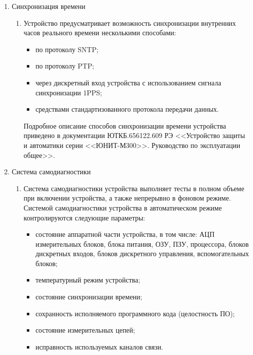 \begin{enumerate}
\begin{enumerate}
\end{enumerate}

\item Синхронизация времени
\begin{enumerate}

\item
Устройство предусматривает возможность синхронизации внутренних часов реального времени несколькими способами:
\begin{itemize}
\item по протоколу SNTP;
\item по протоколу PTP;
\item через дискретный вход устройства с использованием сигнала синхронизации 1PPS;
\item {средствами стандартизованного протокола передачи данных.}
\end{itemize}
Подробное описание способов синхронизации времени устройства приведено в документации ЮТКБ.656122.609 РЭ <<Устройство защиты и автоматики серии <<ЮНИТ-М300>>. Руководство по эксплуатации общее>>.

\end{enumerate}

\item Система самодиагностики
\begin{enumerate}

\item
Система самодиагностики устройства выполняет тесты в полном объеме при включении устройства, а также непрерывно в фоновом режиме.
Системой самодиагностики устройства в автоматическом режиме контролируются следующие параметры:
\begin{itemize}
\item состояние аппаратной части устройства, в том числе: АЦП измерительных блоков, блока питания, ОЗУ, ПЗУ, процессора, блоков дискретных входов, блоков дискретного управления, вспомогательных блоков;
\item температурный режим устройства;
\item состояние синхронизации времени;
\item сохранность исполняемого программного кода (целостность ПО);
\item состояние измерительных цепей;
\item исправность используемых каналов связи.
\end{itemize}


\end{enumerate}
\end{enumerate}
